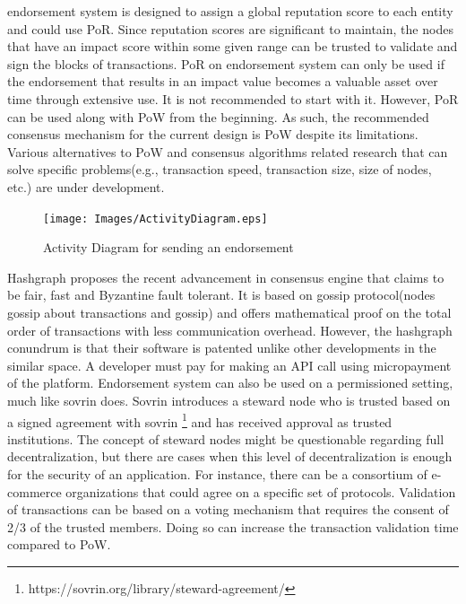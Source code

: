 endorsement system is designed to assign a global reputation score to each
entity and could use PoR. Since reputation scores are significant to maintain,
the nodes that have an impact score within some given range can be trusted to
validate and sign the blocks of transactions. PoR on endorsement system can
only be used if the endorsement that results in an impact value becomes a
valuable asset over time through extensive use. It is not recommended to start
with it. However, PoR can be used along with PoW from the beginning. As such,
the recommended consensus mechanism for the current design is PoW despite its
limitations. Various alternatives to PoW and consensus algorithms related
research that can solve specific problems(e.g., transaction speed, transaction
size, size of nodes, etc.) are under development. 
\begin{figure}[h]
	\centering
	\texttt{[image: Images/ActivityDiagram.eps]}
	\caption{Activity Diagram for sending an endorsement}
	\label{fig:activity}
\end{figure}
Hashgraph \cite{baird2016hashgraph}  proposes the recent advancement in
consensus engine that claims to be fair, fast and Byzantine fault tolerant. It
is based on gossip protocol(nodes gossip about transactions and gossip) and
offers mathematical proof on the total order of transactions with less
communication overhead. However, the hashgraph conundrum is that their software
is patented unlike other developments in the similar space. A developer must
pay for making an API call using micropayment of the platform.  Endorsement
system can also be used on a permissioned setting, much like sovrin
\cite{tobin2016inevitable} does.  Sovrin introduces a steward node who is
trusted based on a signed agreement with sovrin
\footnote{https://sovrin.org/library/steward-agreement/} and has received
approval as trusted institutions. The concept of steward nodes might be
questionable regarding full decentralization, but there are cases when this
level of decentralization is enough for the security of an application.   For
instance, there can be a consortium of e-commerce organizations that could
agree on a specific set of protocols. Validation of transactions can be based
on a voting mechanism that requires the consent of 2/3 of the trusted members.
Doing so can increase the transaction validation time compared to PoW.   


